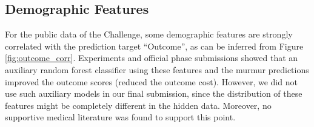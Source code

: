 

\subsection{Demographic Features}
\label{subsec:demo_feat}

For the public data of the Challenge, some demographic features are strongly correlated with the prediction target ``Outcome'', as can be inferred from Figure \ref{fig:outcome_corr}. Experiments and official phase submissions showed that an auxiliary random forest classifier using these features and the murmur predictions improved the outcome scores (reduced the outcome cost). However, we did not use such auxiliary models in our final submission, since the distribution of these features might be completely different in the hidden data. Moreover, no supportive medical literature was found to support this point.


